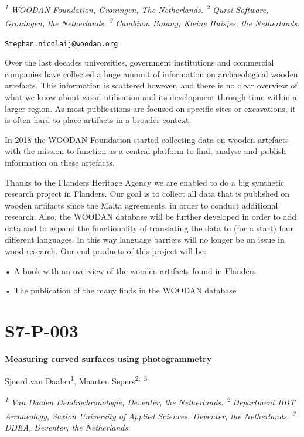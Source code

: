 \documentclass[
]{book}
\begin{document}
\emph{\textsuperscript{1} WOODAN Foundation, Groningen, The Netherlands. \textsuperscript{2} Qursi Software, Groningen, the Netherlands. \textsuperscript{3} Cambium Botany, Kleine Huisjes, the Netherlands.}

\href{mailto:Stephan.nicolaij@woodan.org}{\nolinkurl{Stephan.nicolaij@woodan.org}}

Over the last decades universities, government institutions and commercial companies have collected a huge amount of information on archaeological wooden artefacts. This information is scattered however, and there is no clear overview of what we know about wood utilisation and its development through time within a larger region. As most publications are focused on specific sites or excavations, it is often hard to place artifacts in a broader context.

In 2018 the WOODAN Foundation started collecting data on wooden artefacts with the mission to function as a central platform to find, analyse and publish information on these artefacts.

Thanks to the Flanders Heritage Agency we are enabled to do a big synthetic research project in Flanders. Our goal is to collect all data that is published on wooden artifacts since the Malta agreements, in order to conduct additional research. Also, the WOODAN database will be further developed in order to add data and to expand the functionality of translating the data to (for a start) four different languages. In this way language barriers will no longer be an issue in wood research. Our end products of this project will be:

• A book with an overview of the wooden artifacts found in Flanders

• The publication of the many finds in the WOODAN database

\hypertarget{s7-p-003}{%
\section*{S7-P-003}\label{s7-p-003}}

\textbf{Measuring curved surfaces using photogrammetry}

Sjoerd van Daalen\textsuperscript{1}, Maarten Sepers\textsuperscript{2,~3}

\emph{\textsuperscript{1} Van Daalen Dendrochronologie, Deventer, the Netherlands. \textsuperscript{2} Department BBT Archaeology, Saxion University of Applied Sciences, Deventer, the Netherlands. \textsuperscript{3} DDEA, Deventer, the Netherlands.}
\end{document}
